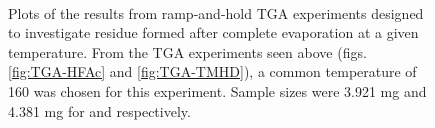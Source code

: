 \begin{figure}[htbp]
   \centering
    \\
   \caption[Constant Temperature TGA Experiments]%
   		{Plots of the results from ramp-and-hold TGA experiments designed to investigate residue formed %
		after complete evaporation at a given temperature. From the TGA experiments seen above (figs.~%
		\vref{fig:TGA-HFAc} and \vref{fig:TGA-TMHD}), a common temperature of 160\degC{} was chosen %
		for this experiment. Sample sizes were 3.921 mg and 4.381 mg for \HFAc{} and \TMHD{} respectively.}
   \label{fig:TGA-Hold}
\end{figure}

